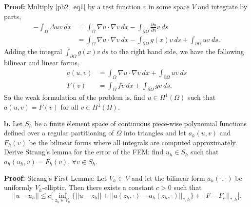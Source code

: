 \documentclass[11pt]{article}
\begin{document}
\textbf{Proof:} Multiply \eqref{pb2_eq1} by a test function $v$ in some space $V$ and integrate by parts,
\begin{align*}
    -\int_\Omega \Delta u v \: dx &= \int_\Omega \nabla u \cdot \nabla v \: dx - \int_{\partial\Omega} \frac{\partial u}{\partial n} v \: ds \\
    &= \int_\Omega \nabla u \cdot \nabla v \: dx - \int_{\partial \Omega} g(x) v \: ds + \int_{\partial\Omega} u v \: ds.
\end{align*}
Adding the integral $\int_{\partial \Omega} g(x) v \: ds $ to the right hand side, we have the following bilinear and linear forms,
\begin{align*}
    a(u,v) &= \int_{\Omega} \nabla u \cdot \nabla v \: dx + \int_{\partial\Omega} uv \: ds \\
    F(v) &= \int_\Omega f v \: dx + \int_{\partial\Omega} g v \: ds.
\end{align*}
So the weak formulation of the problem is, find $u \in H^1(\Omega)$ such that $a(u,v) = F(v)$ for all $v \in H^1(\Omega)$.


\vskip 2cm


\textbf{b.} Let $S_h$ be a finite element space of continuous piece-wise polynomial functions defined over a regular partitioning of $\Omega$ into triangles and let $a_h(u, v)$ and $F_h(v)$ be the bilinear forms where all integrals are computed approximately. 
Derive Strang’s lemma for the error of the FEM: find $u_h \in S_h$ such that $a_h(u_h, v) = F_h(v)$, $\forall v \in S_h$.

\vskip 1cm

\textbf{Proof:} Strang's First Lemma: Let $V_h \subset V$ and let the bilinear form $a_h(\cdot, \cdot)$ be uniformly $V_h$-elliptic.
Then there exists a constant $c > 0$ such that 
\begin{equation*}
    ||u - u_h|| \leq c \Big[ \inf_{z_h \in V_h} \big\{ ||u - z_h|| + ||a(z_h, \cdot) - a_h(z_h, \cdot) ||_{*,h} \big\} + ||F - F_h||_{*,h} \Big].
\end{equation*}
\end{document}
